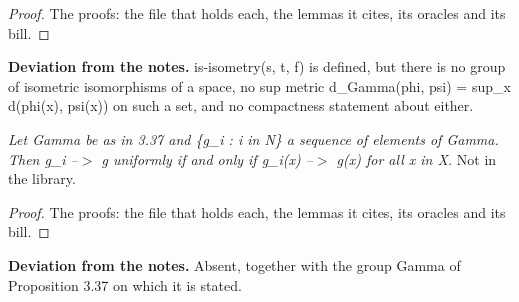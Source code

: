 %
\begin{proof}
%
The proofs: the file that holds each, the lemmas it cites, its oracles and its bill.
%
%
\end{proof}
%
\noindent\textbf{Deviation from the notes.} is-isometry(s, t, f) is defined, but there is no group of isometric isomorphisms of a space, no sup metric d\_Gamma(phi, psi) = sup\_x d(phi(x), psi(x)) on such a set, and no compactness statement about either.
%
\renewcommand{\thethm}{3.38}
\begin{prop}\label{thm:calculus-3.38}
%
\textit{Let Gamma be as in 3.37 and \{g\_i : i in N\} a sequence of elements of Gamma.  Then g\_i --$>$ g uniformly if and only if g\_i(x) --$>$ g(x) for all x in X.}
%
Not in the library.
%
\end{prop}
%
\begin{proof}
%
The proofs: the file that holds each, the lemmas it cites, its oracles and its bill.
%
%
\end{proof}
%
\noindent\textbf{Deviation from the notes.} Absent, together with the group Gamma of Proposition 3.37 on which it is stated.
%
\renewcommand{\thethm}{4.5}
